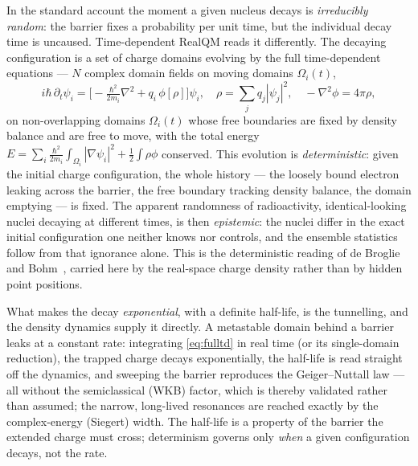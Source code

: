 \documentclass[11pt]{article}
\begin{document}
In the standard account the moment a given nucleus decays is \emph{irreducibly random}: the barrier fixes a
probability per unit time, but the individual decay time is uncaused. Time-dependent RealQM reads it
differently. The decaying configuration is a set of charge domains evolving by the full time-dependent
equations --- $N$ complex domain fields on moving domains $\Omega_i(t)$,
\begin{equation}
i\hbar\,\partial_t\psi_i=\Big[-\tfrac{\hbar^2}{2m_i}\nabla^2+q_i\,\phi[\rho]\Big]\psi_i,\quad
\rho=\sum_j q_j|\psi_j|^2,\quad -\nabla^2\phi=4\pi\rho,
\label{eq:fulltd}
\end{equation}
on non-overlapping domains $\Omega_i(t)$ whose free boundaries are fixed by density balance and are free to
move, with the total energy $E=\sum_i\frac{\hbar^2}{2m_i}\!\int_{\Omega_i}|\nabla\psi_i|^2+\frac12\!\int
\rho\phi$ conserved. This evolution is \emph{deterministic}: given the initial charge configuration, the
whole history --- the loosely bound electron leaking across the barrier, the free boundary tracking density
balance, the domain emptying --- is fixed. The apparent randomness of radioactivity, identical-looking
nuclei decaying at different times, is then \emph{epistemic}: the nuclei differ in the exact initial
configuration one neither knows nor controls, and the ensemble statistics follow from that ignorance alone.
This is the deterministic reading of de Broglie and Bohm~\cite{deBroglie1927,Bohm1952}, carried here by the
real-space charge density rather than by hidden point positions.

What makes the decay \emph{exponential}, with a definite half-life, is the tunnelling, and the density
dynamics supply it directly. A metastable domain behind a barrier leaks at a constant rate: integrating
\eqref{eq:fulltd} in real time (or its single-domain reduction), the trapped charge decays exponentially,
the half-life is read straight off the dynamics, and sweeping the barrier reproduces the Geiger--Nuttall
law --- all without the semiclassical (WKB) factor, which is thereby validated rather than assumed; the
narrow, long-lived resonances are reached exactly by the complex-energy (Siegert) width. The half-life is a
property of the barrier the extended charge must cross; determinism governs only \emph{when} a given
configuration decays, not the rate.
\end{document}

